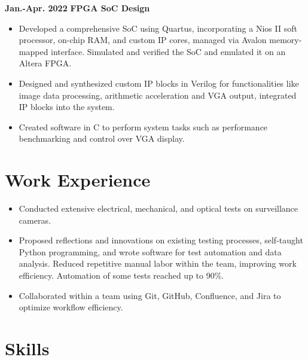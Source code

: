 \documentclass[11pt,a4paper,sans]{moderncv}
\begin{document}
\cventry
{\textnormal{\textbf{Jan.-Apr. 2022}}}
{\textnormal{\textbf{FPGA SoC Design}}}
{}{}{}
{
    \begin{itemize}
    \item Developed a comprehensive SoC using Quartus, incorporating a Nios II soft processor, on-chip RAM, and custom IP cores, managed via Avalon memory-mapped interface. Simulated and verified the SoC and emulated it on an Altera FPGA.
    \item Designed and synthesized custom IP blocks in Verilog for functionalities like image data processing, arithmetic acceleration and VGA output, integrated IP blocks into the system.
    \item Created software in C to perform system tasks such as performance benchmarking and control over VGA display.
    \end{itemize}
}
\vspace{-0.2cm} 

\section{Work Experience}
{
    \begin{itemize}
    \item Conducted extensive electrical, mechanical, and optical tests on surveillance cameras.
    \item Proposed reflections and innovations on existing testing processes, self-taught Python programming, and wrote software for test automation and data analysis. Reduced repetitive manual labor within the team, improving work efficiency. Automation of some tests reached up to 90\%.
    \item Collaborated within a team using Git, GitHub, Confluence, and Jira to optimize workflow efficiency.
    \end{itemize}
}
\vspace{-0.3cm} 

\section{Skills}
\end{document}
